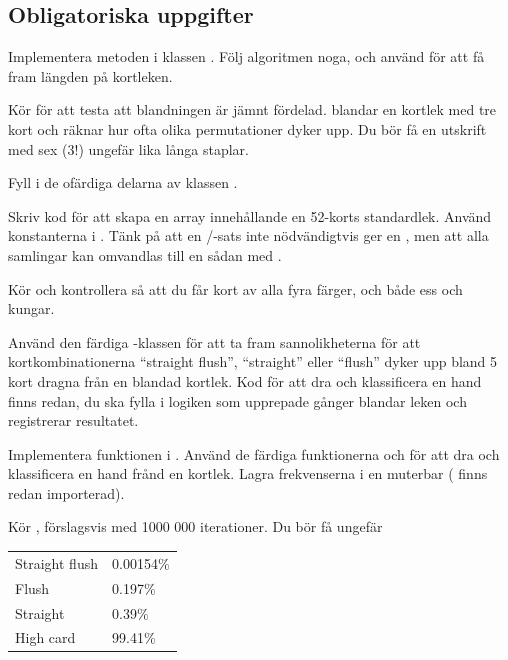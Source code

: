 \subsection{Obligatoriska uppgifter}

\Task 

\Subtask Implementera metoden  i klassen . Följ algoritmen noga, och använd  för att få fram längden på kortleken. 

\Subtask Kör  för att testa att blandningen är jämnt fördelad.  blandar en kortlek med tre kort och räknar hur ofta olika permutationer dyker upp. Du bör få en utskrift med sex ($3!$) ungefär lika långa staplar.

\Task Fyll i de ofärdiga delarna av klassen .

\Subtask Skriv kod för att skapa en array innehållande en 52-korts standardlek. Använd konstanterna i . Tänk på att en /-sats inte nödvändigtvis ger en , men att alla samlingar kan omvandlas till en sådan med .

\Subtask Kör  och kontrollera så att du får kort av alla fyra färger, och både ess och kungar.

\Task Använd den färdiga -klassen för att ta fram sannolikheterna för att kortkombinationerna ``straight flush'', ``straight'' eller ``flush'' dyker upp bland 5 kort dragna från en blandad kortlek.
Kod för att dra och klassificera en hand finns redan, du ska fylla i logiken som upprepade gånger blandar leken och registrerar resultatet.

\Subtask Implementera funktionen  i . Använd de färdiga funktionerna  och  för att dra och klassificera en hand frånd en kortlek. Lagra frekvenserna i en muterbar  ( finns redan importerad).

\Subtask Kör , förslagsvis med 1000 000 iterationer. Du bör få ungefär \\
\begin{tabular}{ll}
Straight flush & 0.00154\%  \\
Flush          & 0.197\%    \\
Straight       & 0.39\%     \\
High card      & 99.41\%
\end{tabular}


